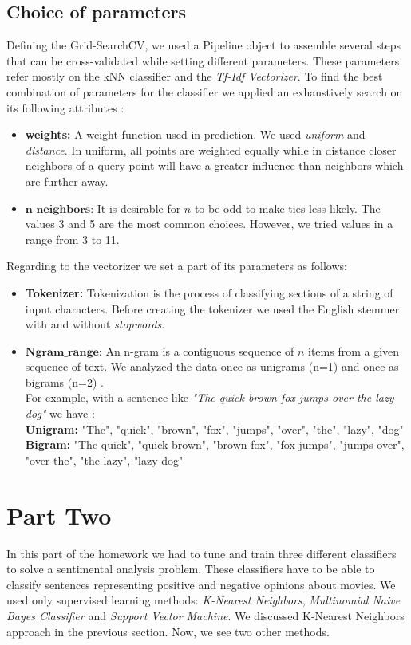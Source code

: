 \documentclass[11pt]{article}
\begin{document}
\subsection{Choice of parameters}
Defining the Grid-SearchCV, we used a Pipeline object to assemble several steps that can be cross-validated while setting different parameters. These parameters refer mostly on the kNN classifier and the \textit{Tf-Idf Vectorizer}. To find the best combination of parameters for the classifier we applied an exhaustively search on its following attributes : 
\begin{itemize}
\item{\textbf{weights:}} A weight function used in prediction. We used \textit{uniform} and \textit{distance}. In uniform, all points are weighted equally while in distance closer neighbors of a query point will have a greater influence than neighbors which are further away. 
\item{$\textbf{n\_neighbors:}$}  It is desirable for $n$ to be odd to make ties less likely. The values 3 and 5 are the most common choices. However, we tried values in a range from 3 to 11.

\end{itemize} 

Regarding to the vectorizer we set a part of its parameters as follows:
\begin{itemize}
\item{\textbf{Tokenizer:}} Tokenization is the process of classifying sections of a string of input characters. Before creating the tokenizer we used the English stemmer with and without \textit{stopwords}. 
\item{$\textbf{Ngram\_range:}$}  An n-gram is a contiguous sequence of $n$ items from a given sequence of text. We analyzed the data once as unigrams (n=1) and once as bigrams (n=2) .\\
For example, with a sentence like \textit{"The quick brown fox jumps over the lazy dog"} we have :\\
\textbf{Unigram:} "The", "quick", "brown", "fox", "jumps", "over", "the", "lazy", "dog"\\
\textbf{Bigram:} "The quick", "quick brown", "brown fox", "fox jumps", "jumps over", "over the", "the lazy", "lazy dog"
\end{itemize}



\section{Part Two}
In this part of the homework we had to tune and train three different classifiers to solve a sentimental analysis problem. These classifiers have to be able to classify sentences representing positive and negative opinions about movies. We used only supervised learning methods: \textit{K-Nearest Neighbors}, \textit{Multinomial Naive Bayes Classifier} and \textit{Support Vector Machine}. We discussed K-Nearest Neighbors approach in the previous section. Now, we see two other methods. 
\end{document}
